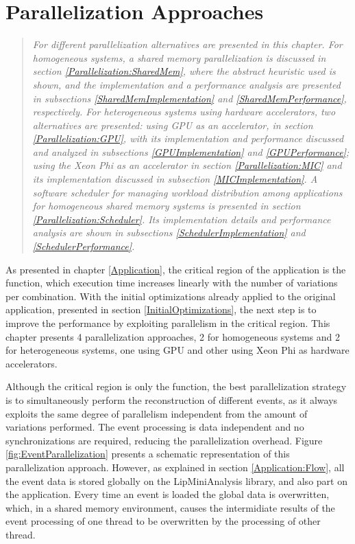 \chapter{Parallelization Approaches}
\label{ParallelizationApproaches}

\begin{quote}
\textit{For different parallelization alternatives are presented in this chapter. For homogeneous systems, a shared memory parallelization is discussed in section \ref{Parallelization:SharedMem}, where the abstract heuristic used is shown, and the implementation and a performance analysis are presented in subsections \ref{SharedMemImplementation} and \ref{SharedMemPerformance}, respectively. For heterogeneous systems using hardware accelerators, two alternatives are presented: using GPU as an accelerator, in section \ref{Parallelization:GPU}, with its implementation and performance discussed and analyzed in subsections \ref{GPUImplementation} and \ref{GPUPerformance}; using the \intel Xeon Phi as an accelerator in section \ref{Parallelization:MIC} and its implementation discussed in subsection \ref{MICImplementation}. A software scheduler for managing workload distribution among applications for homogeneous shared memory systems is presented in section \ref{Parallelization:Scheduler}. Its implementation details and performance analysis are shown in subsections \ref{SchedulerImplementation} and \ref{SchedulerPerformance}.}
\end{quote}

As presented in chapter \ref{Application}, the critical region of the \tth application is the \ttDilepKinFit function, which execution time increases linearly with the number of variations per combination. With the initial optimizations already applied to the original application, presented in section \ref{InitialOptimizations}, the next step is to improve the performance by exploiting parallelism in the critical region. This chapter presents 4 parallelization approaches, 2 for homogeneous systems and 2 for heterogeneous systems, one using GPU and other using \intel Xeon Phi as hardware accelerators.

Although the critical region is only the \ttDilepKinFit function, the best parallelization strategy is to simultaneously perform the reconstruction of different events, as it always exploits the same degree of parallelism independent from the amount of variations performed. The event processing is data independent and no synchronizations are required, reducing the parallelization overhead. Figure \ref{fig:EventParallelization} presents a schematic representation of this parallelization approach. However, as explained in section \ref{Application:Flow}, all the event data is stored globally on the LipMiniAnalysis library, and also part on the application. Every time an event is loaded the global data is overwritten, which, in a shared memory environment, causes the intermidiate results of the event processing of one thread to be overwritten by the processing of other thread.

